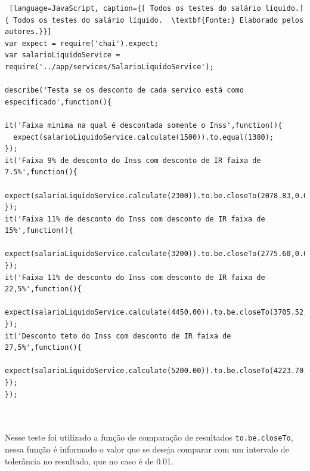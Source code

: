 \begin{lstlisting} [language=JavaScript, caption={[ Todos os testes do salário líquido.]{ Todos os testes do salário líquido.  \textbf{Fonte:} Elaborado pelos autores.}}]
var expect = require('chai').expect;
var salarioLiquidoService = require('../app/services/SalarioLiquidoService');

describe('Testa se os desconto de cada servico está como especificado',function(){
    
it('Faixa minima na qual é descontada somente o Inss',function(){
  expect(salarioLiquidoService.calculate(1500)).to.equal(1380);
});
it('Faixa 9% de desconto do Inss com desconto de IR faixa de 7.5%',function(){
  expect(salarioLiquidoService.calculate(2300)).to.be.closeTo(2078.83,0.01);
});
it('Faixa 11% de desconto do Inss com desconto de IR faixa de 15%',function(){
  expect(salarioLiquidoService.calculate(3200)).to.be.closeTo(2775.60,0.01);
});
it('Faixa 11% de desconto do Inss com desconto de IR faixa de 22,5%',function(){
   expect(salarioLiquidoService.calculate(4450.00)).to.be.closeTo(3705.52,0.01);
});
it('Desconto teto do Inss com desconto de IR faixa de 27,5%',function(){
 expect(salarioLiquidoService.calculate(5200.00)).to.be.closeTo(4223.70,0.01)
});    
});    
    
    
\end{lstlisting}

\par Nesse teste foi utilizado a função de comparação de resultados \texttt{to.be.closeTo}, nessa função é informado o valor que se deseja comparar com um intervalo de tolerância no resultado, que no caso é de 0.01.

